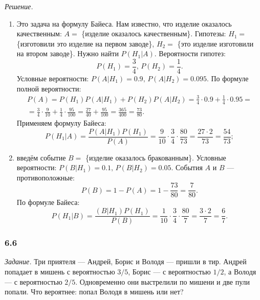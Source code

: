 \textit{Решение.}
\begin{enumerate}[label=\alph*)]
\item Это задача на формулу Байеса.
Нам известно, что изделие оказалось качественным: $A =$ \{изделие оказалось качественным\}.
Гипотезы: $H_1 =$ \{изготовили это изделие на первом заводе\}, $H_2 =$ \{это изделие изготовили на втором заводе\}.
Нужно найти $P \left( \left. H_1 \right| A \right) $.
Вероятности гипотез:
$$P \left( H_1 \right) =
\frac{3}{4}, \,
P \left( H_2 \right) =
\frac{1}{4}.$$
Условные вероятности: $P \left( \left. A \right| H_1 \right) = 0.9, \, P \left( \left. A \right| H_2 \right) = 0.095$.
По формуле полной вероятности:
\begin{equation*}
\begin{split}
P \left( A \right) =
P \left( H_1 \right) P \left( \left. A \right| H_1 \right) + P \left( H_2 \right) P \left( \left. A \right| H_2 \right) =
\frac{3}{4} \cdot 0.9 + \frac{1}{4} \cdot 0.95 = \\
= \frac{3}{4} \cdot \frac{9}{10} + \frac{1}{4} \cdot \frac{95}{100} =
\frac{27}{40} + \frac{95}{100} =
\frac{365}{400} =
\frac{73}{80}.
\end{split}
\end{equation*}
Применяем формулу Байеса:
$$P \left( \left. H_1 \right| A \right) =
\frac{P \left( \left. A \right| H_1 \right) P \left( H_1 \right) }{P \left( A \right) } =
\frac{9}{10} \cdot \frac{3}{4} \cdot \frac{80}{73} =
\frac{27 \cdot 2}{73} =
\frac{54}{73};$$
\item введём событие $B =$ \{изделие оказалось бракованным\}.
Условные вероятности: $P \left( \left. B \right| H_1 \right) = 0.1, \, P \left( \left. B \right| H_2 \right) = 0.05$.
События $A$ и $B$ --- противоположные:
$$P \left( B \right) =
1 - P \left( A \right) =
1 - \frac{73}{80} =
\frac{7}{80}.$$
По формуле Байеса:
$$P \left( \left. H_1 \right| B \right) = \frac{ \left( \left. B \right| H_1 \right) P \left( H_1 \right) }{P \left( B \right) } =
\frac{1}{10} \cdot \frac{3}{4} \cdot \frac{80}{7} =
\frac{3 \cdot 2}{7} =
\frac{6}{7}.$$
\end{enumerate}

\subsubsection*{6.6}

\textit{Задание.} Три приятеля --- Андрей, Борис и Володя --- пришли в тир.
Андрей попадает в мишень с вероятностью $3/5$, Борис --- с вероятностью $1/2$, а Володя --- с вероятностью $2/5$.
Одновременно они выстрелили по мишени и две пули попали.
Что вероятнее: попал Володя в мишень или нет?

